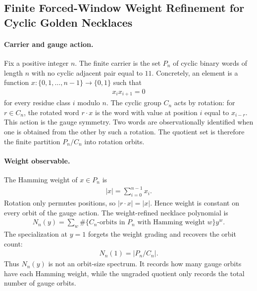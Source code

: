 \subsection{Finite Forced-Window Weight Refinement for Cyclic Golden Necklaces}
\label{sec:window6-clock-gauge-invariant-weight-refined-necklace-polynomial}

\paragraph{Carrier and gauge action.}
Fix a positive integer $n$.  The finite carrier is the set $P_n$ of cyclic binary words of length $n$ with no cyclic adjacent pair equal to $11$.  Concretely, an element is a function $x:\{0,1,\ldots,n-1\}\to \{0,1\}$ such that
$$
\begin{aligned}
 x_i x_{i+1}=0
\end{aligned}
$$
for every residue class $i$ modulo $n$.  The cyclic group $C_n$ acts by rotation: for $r\in C_n$, the rotated word $r\cdot x$ is the word with value at position $i$ equal to $x_{i-r}$.  This action is the gauge symmetry.  Two words are observationally identified when one is obtained from the other by such a rotation.  The quotient set is therefore the finite partition $P_n/C_n$ into rotation orbits.

\paragraph{Weight observable.}
The Hamming weight of $x\in P_n$ is
$$
\begin{aligned}
 |x|=\sum_{i=0}^{n-1} x_i .
\end{aligned}
$$
Rotation only permutes positions, so $|r\cdot x|=|x|$.  Hence weight is constant on every orbit of the gauge action.  The weight-refined necklace polynomial is
$$
\begin{aligned}
 N_n(y)=\sum_w \#\{\text{$C_n$-orbits in $P_n$ with Hamming weight $w$}\}y^w .
\end{aligned}
$$
The specialization at $y=1$ forgets the weight grading and recovers the orbit count:
$$
\begin{aligned}
 N_n(1)=|P_n/C_n| .
\end{aligned}
$$
Thus $N_n(y)$ is not an orbit-size spectrum.  It records how many gauge orbits have each Hamming weight, while the ungraded quotient only records the total number of gauge orbits.

